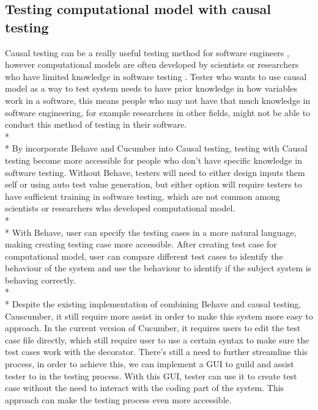 \subsection{Testing computational model with causal testing}
Causal testing can be a really useful testing method for software engineers \cite{Reference13}, however computational models are often developed by scientists or researchers who have limited knowledge in software testing \cite{Reference8}. Tester who wants to use causal model as a way to test system needs to have prior knowledge in how variables work in a software, this means people who may not have that much knowledge in software engineering, for example researchers in other fields, might not be able to conduct this method of testing in their software. \\*\\*
By incorporate Behave and Cucumber into Causal testing, testing with Causal testing become more accessible for people who don’t have specific knowledge in software testing. Without Behave, testers will need to either design inputs them self or using auto test value generation, but either option will require testers to have sufficient training in software testing, which are not common among scientists or researchers who developed computational model. \\*\\*
With Behave, user can specify the testing cases in a more natural language, making creating testing case more accessible. After creating test case for computational model, user can compare different test cases to identify the behaviour of the system and use the behaviour to identify if the subject system is behaving correctly.\\*\\*
Despite the existing implementation of combining Behave and causal testing, Causcumber, it still require more assist in order to make this system more easy to approach. In the current version of Cucumber, it requires users to edit the test case file directly, which still require user to use a certain syntax to make sure the test cases work with the decorator. There’s still a need to further streamline this process, in order to achieve this, we can implement a GUI to guild and assist tester to in the testing process. With this GUI, tester can use it to create test case without the need to interact with the coding part of the system. This approach can make the testing process even more accessible.


